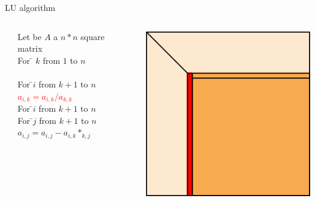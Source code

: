 \begin{frame}{LU algorithm}
\begin{columns}[c]
\begin{column}{0.02\textwidth}
\end{column}
\begin{column}{0.45\textwidth}
\begin{tabbing}
Let be $A$ a $n*n$ square matrix\\
For \= $k$ from $1$ to $n$\\
\>\\
\> For \=$i$ from $k+1$ to $n$\\
\>\> \textcolor{red}{$a_{i,k} = a_{i,k}/a_{k,k}$}\\
\> For \=$i$ from $k+1$ to $n$\\
\>\> For \=$j$ from $k+1$ to $n$\\
\>\>\> \textcolor{borange}{$a_{i,j} = a_{i,j}-a_{i,k}*_{k,j}$}\\
\end{tabbing}
\end{column}
\begin{column}{0.02\textwidth}
\end{column}
\begin{column}{0.45\textwidth}
\includegraphics[width=0.8\linewidth]{linpack}
\end{column}
\end{columns}
\end{frame}


